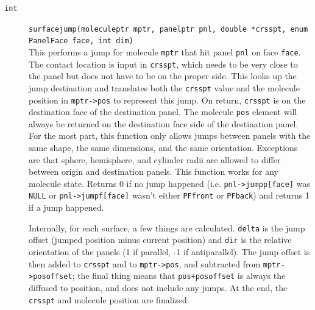 \documentclass {scrbook}
\newcommand {\ttt} {\texttt}
\begin{document}
\begin{description}
\item[\ttt{int}]
\ttt{surfacejump(moleculeptr mptr, panelptr pnl, double *crsspt, enum PanelFace face, int dim)}
\hfill \\
This performs a jump for molecule \ttt{mptr} that hit panel \ttt{pnl} on face \ttt{face}. The contact location is input in \ttt{crsspt}, which needs to be very close to the panel but does not have to be on the proper side. This looks up the jump destination and translates both the \ttt{crsspt} value and the molecule position in \ttt{mptr->pos} to represent this jump. On return, \ttt{crsspt} is on the destination face of the destination panel. The molecule \ttt{pos} element will always be returned on the destination face side of the destination panel. For the most part, this function only allows jumps between panels with the same shape, the same dimensions, and the same orientation. Exceptions are that sphere, hemisphere, and cylinder radii are allowed to differ between origin and destination panels. This function works for any molecule state. Returns 0 if no jump happened (i.e. \ttt{pnl->jumpp[face]} was \ttt{NULL} or \ttt{pnl->jumpf[face]} wasn't either \ttt{PFfront} or \ttt{PFback}) and returns 1 if a jump happened.

Internally, for each surface, a few things are calculated. \ttt{delta} is the jump offset (jumped position minus current position) and \ttt{dir} is the relative orientation of the panels (1 if parallel, -1 if antiparallel). The jump offset is then added to \ttt{crsspt} and to \ttt{mptr->pos}, and subtracted from \ttt{mptr->posoffset}; the final thing means that \ttt{pos+posoffset} is always the diffused to position, and does not include any jumps. At the end, the \ttt{crsspt} and molecule position are finalized.


\end{description}
\end{document}
